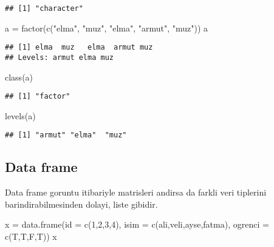 \documentclass[
]{book}
\newenvironment{Shaded}{\begin{snugshade}}{\end{snugshade}}
\newcommand{\AttributeTok}[1]{\textcolor[rgb]{0.77,0.63,0.00}{#1}}
\newcommand{\DecValTok}[1]{\textcolor[rgb]{0.00,0.00,0.81}{#1}}
\newcommand{\FunctionTok}[1]{\textcolor[rgb]{0.00,0.00,0.00}{#1}}
\newcommand{\NormalTok}[1]{#1}
\newcommand{\OtherTok}[1]{\textcolor[rgb]{0.56,0.35,0.01}{#1}}
\newcommand{\StringTok}[1]{\textcolor[rgb]{0.31,0.60,0.02}{#1}}
\begin{document}
\begin{verbatim}
## [1] "character"
\end{verbatim}

\begin{Shaded}
\begin{Highlighting}[]
\NormalTok{a }\OtherTok{=} \FunctionTok{factor}\NormalTok{(}\FunctionTok{c}\NormalTok{(}\StringTok{"elma"}\NormalTok{, }\StringTok{"muz"}\NormalTok{, }\StringTok{"elma"}\NormalTok{, }\StringTok{"armut"}\NormalTok{, }\StringTok{"muz"}\NormalTok{))}
\NormalTok{a}
\end{Highlighting}
\end{Shaded}

\begin{verbatim}
## [1] elma  muz   elma  armut muz  
## Levels: armut elma muz
\end{verbatim}

\begin{Shaded}
\begin{Highlighting}[]
\FunctionTok{class}\NormalTok{(a)}
\end{Highlighting}
\end{Shaded}

\begin{verbatim}
## [1] "factor"
\end{verbatim}

\begin{Shaded}
\begin{Highlighting}[]
\FunctionTok{levels}\NormalTok{(a)}
\end{Highlighting}
\end{Shaded}

\begin{verbatim}
## [1] "armut" "elma"  "muz"
\end{verbatim}

\hypertarget{data-frame}{%
\subsection{Data frame}\label{data-frame}}

Data frame goruntu itibariyle matrisleri andirsa da farkli veri tiplerini barindirabilmesinden dolayi, liste gibidir.

\begin{Shaded}
\begin{Highlighting}[]
\NormalTok{x }\OtherTok{=} \FunctionTok{data.frame}\NormalTok{(}\AttributeTok{id =} \FunctionTok{c}\NormalTok{(}\DecValTok{1}\NormalTok{,}\DecValTok{2}\NormalTok{,}\DecValTok{3}\NormalTok{,}\DecValTok{4}\NormalTok{),}
               \AttributeTok{isim =} \FunctionTok{c}\NormalTok{(}\StringTok{\textquotesingle{}ali\textquotesingle{}}\NormalTok{,}\StringTok{\textquotesingle{}veli\textquotesingle{}}\NormalTok{,}\StringTok{\textquotesingle{}ayse\textquotesingle{}}\NormalTok{,}\StringTok{\textquotesingle{}fatma\textquotesingle{}}\NormalTok{), }
               \AttributeTok{ogrenci =} \FunctionTok{c}\NormalTok{(T,T,F,T))}
\NormalTok{x}
\end{Highlighting}
\end{Shaded}
\end{document}

